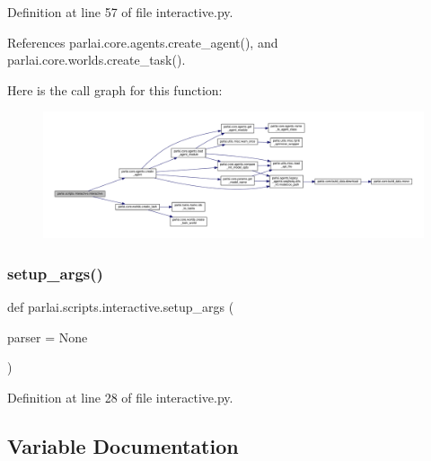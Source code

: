 Definition at line 57 of file interactive.\+py.



References parlai.\+core.\+agents.\+create\+\_\+agent(), and parlai.\+core.\+worlds.\+create\+\_\+task().

Here is the call graph for this function\+:
\nopagebreak
\begin{figure}[H]
\begin{center}
\leavevmode
\includegraphics[width=350pt]{namespaceparlai_1_1scripts_1_1interactive_aae322ec752aa32b1304870833db25f13_cgraph}
\end{center}
\end{figure}
\mbox{\label{namespaceparlai_1_1scripts_1_1interactive_a873c4ae402aee061884a22139a5a442f}} 
\subsubsection{\texorpdfstring{setup\+\_\+args()}{setup\_args()}}
{\footnotesize\ttfamily def parlai.\+scripts.\+interactive.\+setup\+\_\+args (\begin{DoxyParamCaption}\item[{}]{parser = {\ttfamily None} }\end{DoxyParamCaption})}



Definition at line 28 of file interactive.\+py.



\subsection{Variable Documentation}
\mbox{\label{namespaceparlai_1_1scripts_1_1interactive_af631be047dd505af8c9365e15ed26c16}} 
